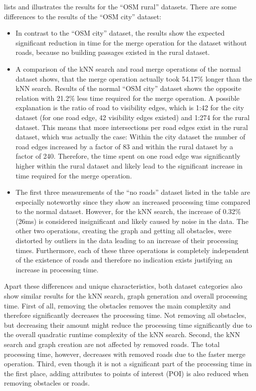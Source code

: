 			\noindent
			 lists and illustrates the results for the \enquote{OSM rural} datasets.
			There are some differences to the results of the \enquote{OSM city} dataset:
			\begin{itemize}
				\item In contrast to the \enquote{OSM city} dataset, the results show the expected significant reduction in time for the merge operation for the dataset without roads, because no building passages existed in the rural dataset.
				\item A comparison of the kNN search and road merge operations of the normal dataset shows, that the merge operation actually took 54.17\% longer than the kNN search.
				Results of the normal \enquote{OSM city} dataset shows the opposite relation with 21.2\% less time required for the merge operation.
				A possible explanation is the ratio of road to visibility edges, which is 1:42 for the city dataset (for one road edge, 42 visibility edges existed) and 1:274 for the rural dataset.
				This means that more intersections per road edges exist in the rural dataset, which was actually the case:
				Within the city dataset the number of road edges increased by a factor of 83 and within the rural dataset by a factor of 240.
				Therefore, the time spent on one road edge was significantly higher within the rural dataset and likely lead to the significant increase in time required for the merge operation.
				\item The first three measurements of the \enquote{no roads} dataset listed in the table are especially noteworthy since they show an increased processing time compared to the normal dataset.
				However, for the kNN search, the increase of 0.32\% (26ms) is considered insignificant and likely caused by noise in the data.
				The other two operations, creating the graph and getting all obstacles, were distorted by outliers in the data leading to an increase of their processing times.
				Furthermore, each of these three operations is completely independent of the existence of roads and therefore no indication exists justifying an increase in processing time.
			\end{itemize}
			Apart these differences and unique characteristics, both dataset categories also show similar results for the kNN search, graph generation and overall processing time.
			First of all, removing the obstacles removes the main complexity and therefore significantly decreases the processing time.
			Not removing all obstacles, but decreasing their amount might reduce the processing time significantly due to the overall quadratic runtime complexity of the kNN search.
			Second, the kNN search and graph creation are not affected by removed roads.
			The total processing time, however, decreases with removed roads due to the faster merge operation.
			Third, even though it is not a significant part of the processing time in the first place, adding attributes to points of interest (POI) is also reduced when removing obstacles or roads.
	
